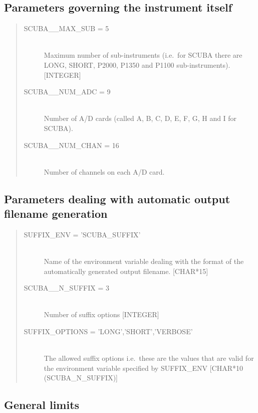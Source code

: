 \documentclass[twoside,11pt,nolof]{starlink}
\begin{document}
\subsection{Parameters governing the instrument itself}

\begin{quote}
\begin{description}
  \item[SCUBA\_\_MAX\_SUB = 5] \mbox{} \\
    Maximum number of sub-instruments (i.e.\ for SCUBA there are LONG, SHORT,
P2000, P1350 and P1100 sub-instruments). [INTEGER]
  \item[SCUBA\_\_NUM\_ADC = 9] \mbox{} \\
    Number of A/D cards (called A, B, C, D, E, F, G, H and I for SCUBA).
  \item[SCUBA\_\_NUM\_CHAN = 16] \mbox{} \\
    Number of channels on each A/D card.
\end{description}
\end{quote}

\subsection{Parameters dealing with automatic output filename generation}

\begin{quote}
\begin{description}

  \item[SUFFIX\_ENV = 'SCUBA\_SUFFIX'] \mbox{} \\
    Name of the environment variable dealing with the format of the
automatically generated output filename. [CHAR*15]

  \item[SCUBA\_\_N\_SUFFIX = 3] \mbox{} \\
    Number of suffix options [INTEGER]

  \item[SUFFIX\_OPTIONS = 'LONG','SHORT','VERBOSE']\mbox{} \\
    The allowed suffix options i.e.\ these are the values that are valid for
the environment variable specified by SUFFIX\_ENV [CHAR*10 (SCUBA\_N\_SUFFIX)]

\end{description}
\end{quote}

\subsection{General limits}
\end{document}
